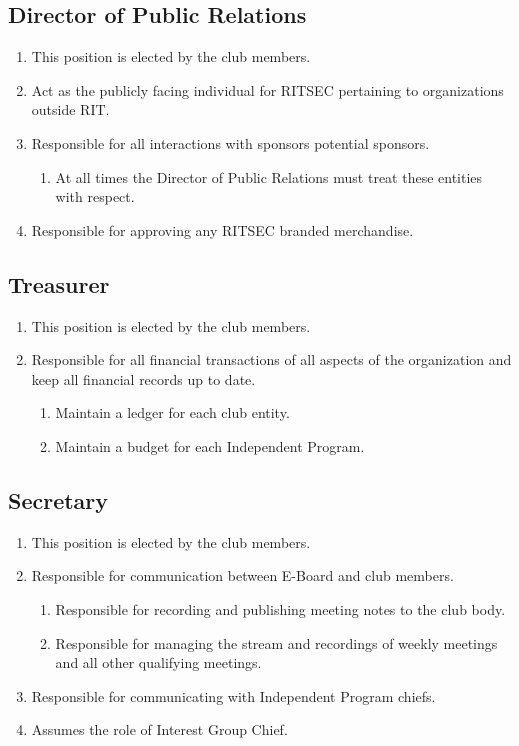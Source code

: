 \documentclass{article}
\begin{document}
\subsection{Director of Public Relations}

\begin{enumerate}
  \item This position is elected by the club members.
  \item Act as the publicly facing individual for RITSEC pertaining to
    organizations outside RIT.
  \item Responsible for all interactions with sponsors potential sponsors.
  \begin{enumerate}
    \item At all times the Director of Public Relations must treat these
      entities with respect.
  \end{enumerate}
  \item Responsible for approving any RITSEC branded merchandise.
\end{enumerate}

\subsection{Treasurer}

\begin{enumerate}
  \item This position is elected by the club members.
  \item Responsible for all financial transactions of all aspects of the organization and keep all financial records up to date.
  \begin{enumerate}
    \item Maintain a ledger for each club entity.
    \item Maintain a budget for each Independent Program.
  \end{enumerate}
\end{enumerate}

\subsection{Secretary}

\begin{enumerate}
  \item This position is elected by the club members.
  \item Responsible for communication between E-Board and club members.
  \begin{enumerate}
    \item Responsible for recording and publishing meeting notes to the club
      body.
    \item Responsible for managing the stream and recordings of weekly meetings
      and all other qualifying meetings.
  \end{enumerate}
  \item Responsible for communicating with Independent Program chiefs.
  \item Assumes the role of Interest Group Chief.
\end{enumerate}
\end{document}
